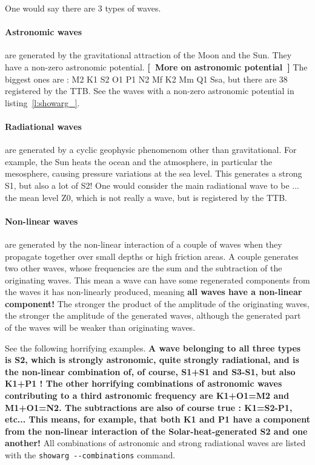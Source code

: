 \documentclass[11pt]{article} %
\providecommand{\code}[1]{\hbox{\lstinline|#1|}}
\newcommand{\lref}[1]{listing~\ref{#1}}
\providecommand{\mynote}[1]{{\color[rgb]{1,.4,0}\sffamily\bfseries[~#1~]}}%
\providecommand{\mynote}[1]{}%
\begin{document}
\begin{multicols}{2}
One would say there are 3 types of waves.

\paragraph{Astronomic waves}
are generated by the gravitational attraction of the Moon and the Sun.
They have a non-zero astronomic potential.
\mynote{More on astronomic potential}
The biggest ones are : M2 K1 S2 O1 P1 N2 Mf K2 Mm Q1 Ssa,
 but there are 38 registered by the \ac{TTB}.
See the waves with a non-zero astronomic potential in \lref{l:showarg_}.

\paragraph{Radiational waves}
are generated by a cyclic geophysic phenomenom other than gravitational.
For example, the Sun heats the ocean and the atmosphere, in particular the mesosphere, causing pressure variations at the sea level.
This generates a strong S1, but also a lot of S2!
One would consider the main radiational wave to be ... the mean level Z0, which is not really a wave, but is registered by the \ac{TTB}.

\paragraph{Non-linear waves}
are generated by the non-linear interaction of a couple of waves when they propagate together over small depths or high friction areas.
A couple generates two other waves, whose frequencies are the sum and the subtraction of the originating waves.
This mean a wave can have some regenerated components from the waves it has non-linearly produced, meaning {\bfseries all waves have a non-linear component!}
The stronger the product of the amplitude of the originating waves, the stronger the amplitude of the generated waves, although the generated part of the waves will be weaker than originating waves.

See the following horrifying examples.
{\bfseries
A wave belonging to all three types is S2, which is strongly astronomic, quite strongly radiational, and is the non-linear combination of, of course, S1+S1 and S3-S1, but also K1+P1 !
The other horrifying combinations of astronomic waves contributing to a third astronomic frequency are K1+O1=M2 and M1+O1=N2.
The subtractions are also of course true : K1=S2-P1, etc...
This means, for example, that both K1 and P1 have a component from the non-linear interaction of the Solar-heat-generated S2 and one another!
}
All combinations of astronomic and strong radiational waves are listed with the \code{showarg --combinations} command.


\end{multicols}
\end{document}
